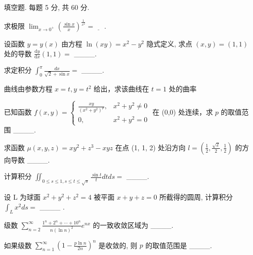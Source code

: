 \par{}
填空题. 每题 5 分, 共 60 分.\par
求极限  $\lim_{x\to0^{+}}\left(\frac{\sin x}{x}\right)^{\frac{1}{x^{2}}}=\underline{\quad}$ .\par
设函数 $y = y(x)$ 由方程 $\ln(xy) = x^2 - y^2$ 隐式定义, 求点 $(x, y) = (1, 1)$ 处的导数 $\frac{\mathrm{d}y}{\mathrm{d}x}(1, 1) =$ \_\_\_\_.\par
求定积分  $\int_{0}^{\pi}\frac{dx}{\sqrt{2}+\sin x}=$  \_\_\_\_.\par
曲线由参数方程 $x = t, y = t^2$ 给出，求该曲线在 $t = 1$ 处的曲率\par
已知函数 $f(x, y) = \begin{cases} \frac{xy}{(x^2 + y^2)^p}, & x^2 + y^2 \neq 0 \\ 0, & x^2 + y^2 = 0 \end{cases}$ 在 (0,0) 处连续，求 $p$ 的取值范围 \_\_\_\_.\par
求函数 $\mu(x, y, z) = xy^2 + z^3 - xyz$ 在点 (1, 1, 2) 处沿方向 $l = \left(\frac{1}{2}, \frac{\sqrt{2}}{2}, \frac{1}{2}\right)$ 的方向导数 \_\_\_\_.\par
计算积分  $\iint_{0\leq s\leq1,s\leq t\leq\sqrt{s}}\frac{\sin t}{t}dtds=$  \_\_\_\_.\par
设 L 为球面  $x^{2} + y^{2} + z^{2} = 4$  被平面  $x + y + z = 0$  所截得的圆周, 计算积分  $\int_{L} x^{2} ds =$ \_\_\_\_ .\par
级数  $\sum_{n=2}^{\infty}\frac{1^{n}+2^{n}+\cdots+10^{n}}{n(\ln n)^{2}}e^{nx}$  的一致收敛区域为 \_\_\_\_.\par
如果级数 $\sum_{n=1}^{\infty}\left(1 - \frac{p\ln n}{2n}\right)^n$ 是收敛的, 则 $p$ 的取值范围是 \_\_\_\_.\par
